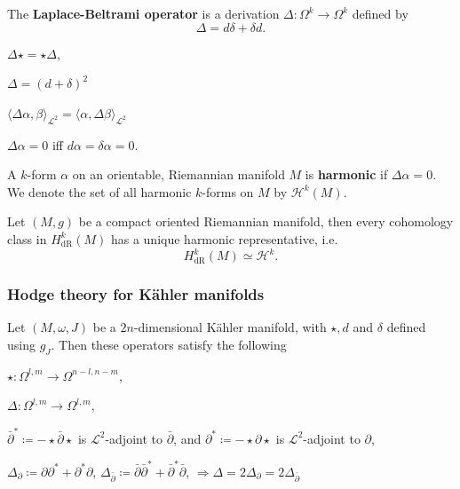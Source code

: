\documentclass[11pt, final]{article}
\begin{document}
\begin{definition}
	The \textbf{Laplace-Beltrami operator} is a derivation $\Delta: \Omega^k \to \Omega^k$ defined by
		\begin{equation}
			\Delta = d \delta + \delta d.
		\end{equation}
\end{definition}
\begin{remark}\hfill
	\begin{ronumerate}
		\item $\Delta \star = \star \Delta$,
		\item $\Delta = (d + \delta)^2$
		\item $\langle \Delta \alpha, \beta \rangle_{\mathcal{L}^2} = \langle \alpha , \Delta\beta \rangle_{\mathcal{L}^2}$
		\item $\Delta \alpha = 0$ iff $d\alpha = \delta \alpha = 0$.
	\end{ronumerate}
\end{remark}

\begin{definition}
	A $k$-form $\alpha$ on an orientable, Riemannian manifold $M$ is \textbf{harmonic} if $\Delta \alpha = 0$. We denote the set of all harmonic $k$-forms on $M$ by $\mathcal{H}^k(M)$.
\end{definition}

\begin{theorem}[Hodge]\label{thm:cplxHodge}
	Let $(M,g)$ be a compact oriented Riemannian manifold, then every cohomology class in $H^k_\mathrm{dR}(M)$ has a unique harmonic representative, i.e.
		\begin{equation}
			H^k_\mathrm{dR}(M) \simeq \mathcal{H}^k.
		\end{equation}
\end{theorem}

\subsubsection{Hodge theory for K\"ahler manifolds}

\begin{prop}
	Let $(M, \omega, J)$ be a $2n$-dimensional K\"ahler manifold, with $\star, d$ and $\delta$ defined using $g_J$. Then these operators satisfy the following
		\begin{ronumerate}
			\item $\star: \Omega^{l,m} \to \Omega^{n-l,n-m}$,
			\item $\Delta: \Omega^{l,m} \to \Omega^{l,m}$,
			\item $\bar{\partial}^* \coloneqq - \star \bar{\partial} \star$ is $\mathcal{L}^2$-adjoint to $\bar{\partial}$, and ${\partial}^* \coloneqq - \star {\partial} \star$ is $\mathcal{L}^2$-adjoint to ${\partial}$,
			\item $\Delta_\partial \coloneqq \partial \partial^* + \partial^* \partial$, $\Delta_{\bar{\partial}} \coloneqq \bar{\partial }\bar{\partial}^* + \bar{\partial}^* \bar{\partial}$, $\Rightarrow \Delta = 2\Delta_\partial = 2 \Delta_{\bar{\partial}}$
		\end{ronumerate}
\end{prop}
\end{document}
